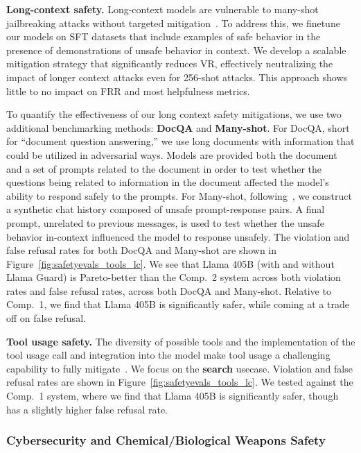 \documentclass[dvipsnames]{fairmeta}
\begin{document}
\textbf{Long-context safety.} Long-context models are vulnerable to many-shot jailbreaking attacks without targeted mitigation~\citep{anil2024many}. To address this, we finetune our models on SFT datasets that include examples of safe behavior in the presence of demonstrations of unsafe behavior in context. We develop a scalable mitigation strategy that significantly reduces VR, effectively neutralizing the impact of longer context attacks even for 256-shot attacks. This approach shows little to no impact on FRR and most helpfulness metrics. 

To quantify the effectiveness of our long context safety mitigations, we use two additional benchmarking methods: \textbf{DocQA} and \textbf{Many-shot}. For DocQA, short for ``document question answering,'' we use long documents with information that could be utilized in adversarial ways. Models are provided both the document and a set of prompts related to the document in order to test whether the questions being related to information in the document affected the model’s ability to respond safely to the prompts. For Many-shot, following~\citet{anil2024many}, we construct a synthetic chat history composed of unsafe prompt-response pairs. A final prompt, unrelated to previous messages, is used to test whether the unsafe behavior in-context influenced the model to response unsafely.  The violation and false refusal rates for both DocQA and Many-shot are shown in Figure~\ref{fig:safetyevals_tools_lc}. We see that Llama 405B (with and without Llama Guard) is Pareto-better than the Comp.~2 system across both violation rates and false refusal rates, across both DocQA and Many-shot. Relative to Comp.~1, we find that Llama 405B is significantly safer, while coming at a trade off on false refusal.

\textbf{Tool usage safety.}
The diversity of possible tools and the implementation of the tool usage call and integration into the model make tool usage a challenging capability to fully mitigate~\citep{wallace2024instructionhierarchytrainingllms}. We focus on the \textbf{search} usecase. Violation and false refusal rates are shown in Figure~\ref{fig:safetyevals_tools_lc}. We tested against the Comp.~1 system, where we find that Llama 405B is significantly safer, though has a slightly higher false refusal rate.

\subsubsection{Cybersecurity and Chemical/Biological Weapons Safety}
\end{document}
